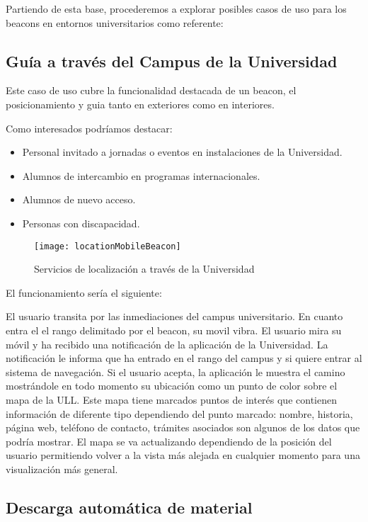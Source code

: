 Partiendo de esta base, procederemos a explorar posibles casos de uso para los beacons en entornos universitarios como referente:

\subsection{Guía a través del Campus de la Universidad}

Este caso de uso cubre la funcionalidad destacada de un beacon, el posicionamiento y guia tanto en exteriores como en interiores. 

Como interesados podríamos destacar: 

\begin{itemize}
\item Personal invitado a jornadas o eventos en instalaciones de la Universidad.
\item Alumnos de intercambio en programas internacionales.
\item Alumnos de nuevo acceso.
\item Personas con discapacidad.
\end{itemize}

\begin{figure}[h]
	\centering
	\texttt{[image: locationMobileBeacon]}
	\caption{Servicios de localización a través de la Universidad}
	\label{fig:beaconLocation}
\end{figure}

El funcionamiento sería el siguiente: 

El usuario transita por las inmediaciones del campus universitario. En cuanto entra el el rango delimitado por el beacon, su movil vibra. El usuario mira su móvil y ha recibido una notificación de la aplicación de la Universidad. La notificación le informa que ha entrado en el rango del campus y si quiere entrar al sistema de navegación. Si el usuario acepta, la aplicación le muestra el camino mostrándole en todo momento su ubicación como un punto de color sobre el mapa de la ULL. Este mapa tiene marcados puntos de interés que contienen información de diferente tipo dependiendo del punto marcado: nombre, historia, página web, teléfono de contacto, trámites asociados son algunos de los datos que podría mostrar. El mapa se va actualizando dependiendo de la posición del usuario permitiendo volver a la vista más alejada en cualquier momento para una visualización más general.


\subsection{Descarga automática de material}

